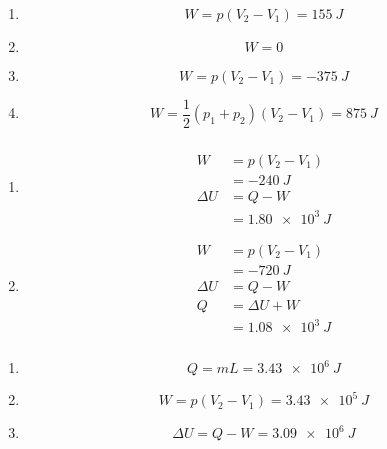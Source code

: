 \documentclass{article}
\begin{document}
\subsubsection{}

\begin{enumerate}
  \item \[W = p (V_2 - V_1) = \qty{155}{J}\]

  \item \[W = 0\]

  \item \[W = p (V_2 - V_1) = \qty{-375}{J}\]

  \item \[W = \frac{1}{2} (p_1 + p_2) (V_2 - V_1) = \qty{875}{J}\]
\end{enumerate}

\subsubsection{}

\begin{enumerate}
  \item

        \begin{align*}
          W        & = p (V_2 - V_1)   \\
                   & = \qty{-240}{J}   \\
          \Delta U & = Q - W           \\
                   & = \qty{1.80e3}{J}
        \end{align*}

  \item

        \begin{align*}
          W        & = p (V_2 - V_1)   \\
                   & = \qty{-720}{J}   \\
          \Delta U & = Q - W           \\
          Q        & = \Delta U + W    \\
                   & = \qty{1.08e3}{J}
        \end{align*}
\end{enumerate}

\subsubsection{}

\begin{enumerate}
  \item \[Q = m L = \qty{3.43e6}{J}\]

  \item \[W = p (V_2 - V_1) = \qty{3.43e5}{J}\]

  \item \[\Delta U = Q - W = \qty{3.09e6}{J}\]
\end{enumerate}
\end{document}

